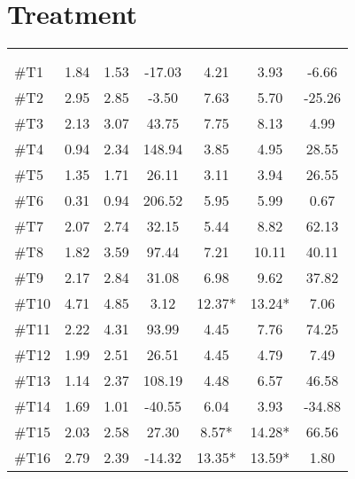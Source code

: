 \section{Treatment}
\begin{longtable} {l|c|c|c|c|c|c}
 \rowcolor[HTML]{C0C0C0} 
  \color[HTML]{000000}{} & 
 \multicolumn{3}{c|}{ \color[HTML]{000000}{\textbf{Threshold}}} & \multicolumn{3}{c}{ \color[HTML]{000000}{\textbf{Tolerance}}}  	\\  \rule{0pt}{3ex} 
  \cellcolor[HTML]{C0C0C0}{} &
 \multicolumn{1}{c|}{ \cellcolor[HTML]{C0C0C0}{Pre [KgF]}} & \multicolumn{1}{c|}{ \cellcolor[HTML]{C0C0C0}{Post [KgF]}} 
 & \multicolumn{1}{c}{ \cellcolor[HTML]{C0C0C0}{\textcolor[HTML]{C0C0C0}{0}Diff [\%]\textcolor[HTML]{C0C0C0}{0}}}
 & \multicolumn{1}{|c|}{ \cellcolor[HTML]{C0C0C0}{Pre [KgF]}} 
 & \multicolumn{1}{c|}{ \cellcolor[HTML]{C0C0C0}{Post [KgF]}} 
 & \multicolumn{1}{c}{ \cellcolor[HTML]{C0C0C0}{\textcolor[HTML]{C0C0C0}{0}Diff [\%]\textcolor[HTML]{C0C0C0}{0}}}  	\\ \hline 
\#T1 & 1.84 & 1.53 & -17.03 & 4.21 & 3.93 & -6.66 \\ \hline
\#T2 & 2.95 & 2.85  & -3.50 & 7.63  & 5.70 & -25.26 \\ \hline
\#T3 & 2.13 & 3.07 & 43.75 & 7.75 & 8.13 & 4.99 \\ \hline
\#T4 & 0.94 & 2.34  & 148.94  & 3.85 & 4.95 & 28.55 \\ \hline
\#T5 & 1.35 & 1.71  & 26.11 & 3.11 & 3.94 & 26.55 \\ \hline	
\#T6 & 0.31 & 0.94   & 206.52 & 5.95 & 5.99 & 0.67 \\ \hline
\#T7 & 2.07 & 2.74  & 32.15 & 5.44 & 8.82 & 62.13 \\ \hline
\#T8 & 1.82 & 3.59 & 97.44 & 7.21 & 10.11 & 40.11 \\ \hline
\#T9 & 2.17 & 2.84  & 31.08 & 6.98 & 9.62 & 37.82 \\ \hline
\#T10 & 4.71 & 4.85  & 3.12 & 12.37*  & 13.24* & 7.06 \\ \hline
\#T11 & 2.22 & 4.31 & 93.99 & 4.45 & 7.76 & 74.25 \\ \hline
\#T12 & 1.99 & 2.51 & 26.51 & 4.45 & 4.79 & 7.49 \\ \hline
\#T13 & 1.14 & 2.37 & 108.19 & 4.48 & 6.57 & 46.58 \\ \hline
\#T14 & 1.69 & 1.01 & -40.55 & 6.04 & 3.93 & -34.88 \\ \hline
\#T15 & 2.03 & 2.58 & 27.30 & 8.57* & 14.28* & 66.56 \\ \hline
\#T16 & 2.79 & 2.39 & -14.32 & 13.35* & 13.59* & 1.80 \\ \hline

\end{longtable}
